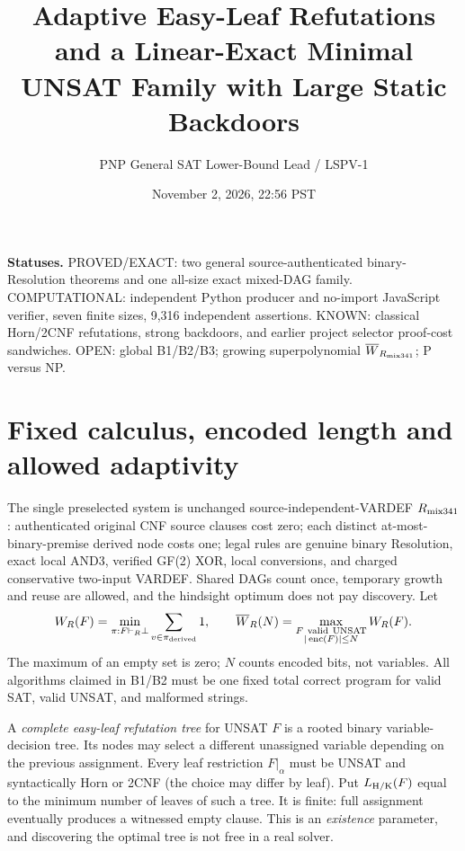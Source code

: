 \documentclass[11pt]{article}
\title{Adaptive Easy-Leaf Refutations and a Linear-Exact Minimal UNSAT Family with Large Static Backdoors}
\author{PNP General SAT Lower-Bound Lead / LSPV-1}
\date{November 2, 2026, 22:56 PST}
\begin{document}
\maketitle

\noindent\textbf{Statuses.} PROVED/EXACT: two general source-authenticated binary-Resolution theorems and one all-size exact mixed-DAG family. COMPUTATIONAL: independent Python producer and no-import JavaScript verifier, seven finite sizes, 9,316 independent assertions. KNOWN: classical Horn/2CNF refutations, strong backdoors, and earlier project selector proof-cost sandwiches. OPEN: global B1/B2/B3; growing superpolynomial \(\overline W_{R_{\rm mix341}}\); P versus NP.

\section*{Fixed calculus, encoded length and allowed adaptivity}
The single preselected system is unchanged source-independent-VARDEF \(R_{\rm mix341}\): authenticated original CNF source clauses cost zero; each distinct at-most-binary-premise derived node costs one; legal rules are genuine binary Resolution, exact local AND3, verified GF(2) XOR, local conversions, and charged conservative two-input VARDEF. Shared DAGs count once, temporary growth and reuse are allowed, and the hindsight optimum does not pay discovery. Let
\[
W_R(F)=\min_{\pi:F\vdash_R\bot}\sum_{v\in\pi_{\rm derived}}1,\qquad
\overline W_R(N)=\max_{\substack{F\ {\rm valid\ UNSAT}\\|\operatorname{enc}(F)|\le N}}W_R(F).
\]
The maximum of an empty set is zero; \(N\) counts encoded bits, not variables. All algorithms claimed in B1/B2 must be one fixed total correct program for valid SAT, valid UNSAT, and malformed strings.

A \emph{complete easy-leaf refutation tree} for UNSAT \(F\) is a rooted binary variable-decision tree. Its nodes may select a different unassigned variable depending on the previous assignment. Every leaf restriction \(F|_\alpha\) must be UNSAT and syntactically Horn or 2CNF (the choice may differ by leaf). Put \(L_{\rm H/K}(F)\) equal to the minimum number of leaves of such a tree. It is finite: full assignment eventually produces a witnessed empty clause. This is an \emph{existence} parameter, and discovering the optimal tree is not free in a real solver.
\end{document}
